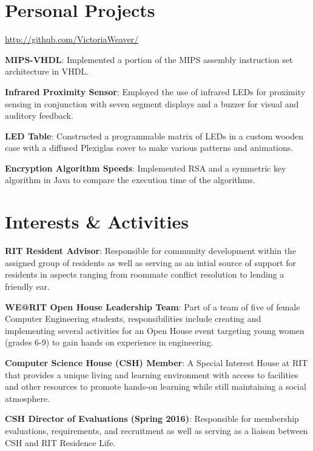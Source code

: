 \documentclass[a4paper,margin,line]{resume}
\begin{document}
\begin{resume}
\section{\mysidestyle Personal Projects}
    \begin{asparablank}
        \item \href{http://github.com/VictoriaWeaver/}{http://github.com/VictoriaWeaver/}\\
        \item \textbf{MIPS-VHDL}: Implemented a portion of the MIPS assembly instruction set 
            architecture in VHDL.\\
        \item \textbf{Infrared Proximity Sensor}: Employed the use of infrared LEDs for proximity 
            sensing in conjunction with seven segment displays and a buzzer for visual and auditory 
            feedback.\\
        \item \textbf{LED Table}: Constructed a programmable matrix of LEDs in a custom wooden 
            case with a diffused Plexiglas cover to make various patterns and animations.\\
        \item \textbf{Encryption Algorithm Speeds}: Implemented RSA and a symmetric key algorithm 
            in Java to compare the execution time of the algorithms.
    \end{asparablank}
    
\section{\mysidestyle Interests \& Activities}
    \begin{asparablank}
        \item \textbf{RIT Resident Advisor}: Responsible for community development within the assigned group of residents as well as 
            serving as an intial source of support for residents in aspects ranging from roommate conflict resolution to lending a friendly 
            ear.\\
        \item \textbf{WE@RIT Open House Leadership Team}: Part of a team of five of female Computer Engineering students, 
        responsibilities include creating and implementing several activities for an Open House event targeting young women (grades 6-9) 
        to gain hands on experience in engineering.\\
        \item \textbf{Computer Science House (CSH) Member}: A Special Interest House at RIT that
            provides a unique living and learning environment with access to facilities and other resources to promote
            hands-on learning while still maintaining a social atmosphere.\\
        \item \textbf{CSH Director of Evaluations (Spring 2016)}: Responsible for membership evaluations, requirements, and recruitment 
            as well as serving as a liaison between CSH and RIT Residence Life.
    \end{asparablank}
\end{resume}
\end{document}

